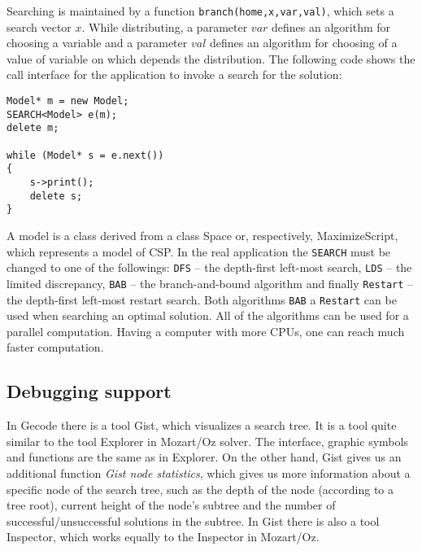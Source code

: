 Searching is maintained by a function \texttt{branch(home,x,var,val)}, which sets a search vector $x$. While distributing,
a parameter $var$ defines an algorithm for choosing a variable and a parameter $val$ defines an algorithm
for choosing of a value of variable on which depends the distribution. The following code shows the call interface
for the application to invoke a search for the solution: 

\begin{verbatim}
Model* m = new Model;	
SEARCH<Model> e(m);
delete m;

while (Model* s = e.next())
{
	s->print();
	delete s;
}  
\end{verbatim}

A model is a class derived from a class Space or, respectively, MaximizeScript, which
represents a model of CSP. In the real application the \texttt{SEARCH} must be changed to one of the followings:
\texttt{DFS} -- the depth-first left-most search, \texttt{LDS} -- the limited discrepancy,
\texttt{BAB} -- the branch-and-bound algorithm and finally \texttt{Restart} -- the depth-first left-most
restart search. Both algorithms \texttt{BAB} a \texttt{Restart} can be used when 
searching an optimal solution. All of the algorithms can be used for a parallel computation.
Having a computer with more CPUs, one can reach much faster computation.

\subsection{Debugging support}
In Gecode there is a tool Gist, which visualizes a search tree. It is a tool quite 
similar to the tool Explorer in Mozart/Oz solver. The interface, graphic symbols and
functions are the same as in Explorer. On the other hand, Gist gives us an additional 
function {\em Gist node statistics}, which gives us more information about a specific node 
of the search tree, such as the depth of the node (according to a tree root), current height
of the node's subtree and the number of successful/unsuccessful solutions in the subtree.
In Gist there is also a tool Inspector, which works equally to the Inspector in Mozart/Oz.
   

